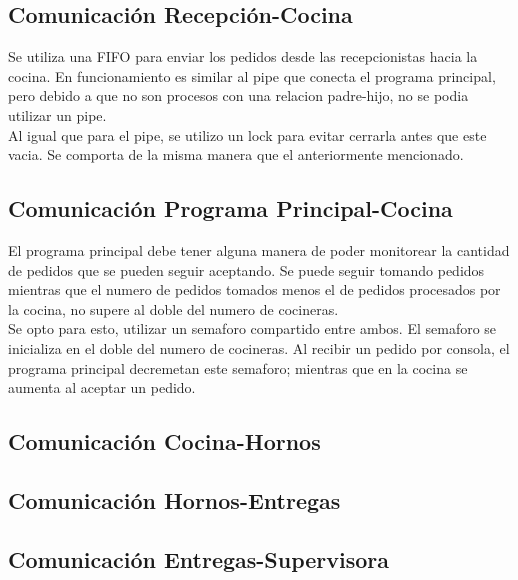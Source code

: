 \documentclass[11pt,spanish,a4paper,openany,notitlepage]{article}
\begin{document}
\subsection{Comunicación Recepción-Cocina}

Se utiliza una FIFO para enviar los pedidos desde las recepcionistas hacia la cocina. En funcionamiento es similar al pipe que conecta el programa principal, pero debido a que no son procesos con una relacion padre-hijo, no se podia utilizar un pipe.\\
Al igual que para el pipe, se utilizo un lock para evitar cerrarla antes que este vacia. Se comporta de la misma manera que el anteriormente mencionado.

\subsection{Comunicación Programa Principal-Cocina}

El programa principal debe tener alguna manera de poder monitorear la cantidad de pedidos que se pueden seguir aceptando. Se puede seguir tomando pedidos mientras que el numero de pedidos tomados menos el de pedidos procesados por la cocina, no supere al doble del numero de cocineras.\\
Se opto para esto, utilizar un semaforo compartido entre ambos. El semaforo se inicializa en el doble del numero de cocineras. Al recibir un pedido por consola, el programa principal decremetan este semaforo; mientras que en la cocina se aumenta al aceptar un pedido. 

\subsection{Comunicación Cocina-Hornos}

\subsection{Comunicación Hornos-Entregas}

\subsection{Comunicación Entregas-Supervisora}
\end{document}

